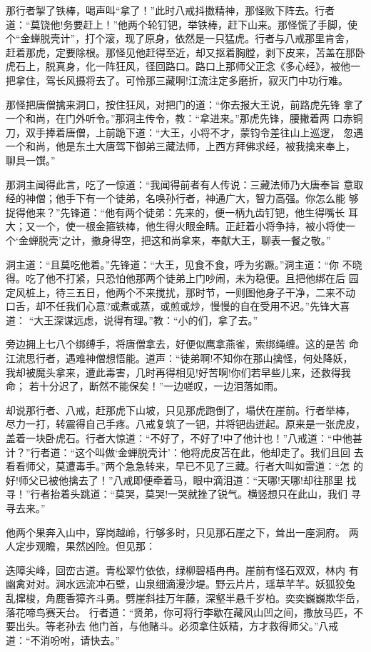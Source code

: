 那行者掣了铁棒，喝声叫“拿了！”此时八戒抖擞精神，那怪败下阵去。行者
道：“莫饶他!务要赶上！”他两个轮钉钯，举铁棒，赶下山来。那怪慌了手脚，使
个“金蝉脱壳计”，打个滚，现了原身，依然是一只猛虎。行者与八戒那里肯舍，
赶着那虎，定要除根。那怪见他赶得至近，却又抠着胸膛，剥下皮来，苫盖在那卧
虎石上，脱真身，化一阵狂风，径回路口。路口上那师父正念《多心经》，被他一
把拿住，驾长风摄将去了。可怜那三藏啊!江流注定多磨折，寂灭门中功行难。

那怪把唐僧擒来洞口，按住狂风，对把门的道：“你去报大王说，前路虎先锋
拿了一个和尚，在门外听令。”那洞主传令，教：“拿进来。”那虎先锋，腰撇着两
口赤铜刀，双手捧着唐僧，上前跪下道：“大王，小将不才，蒙钧令差往山上巡逻，
忽遇一个和尚，他是东土大唐驾下御弟三藏法师，上西方拜佛求经，被我擒来奉上，
聊具一馔。”

那洞主闻得此言，吃了一惊道：“我闻得前者有人传说：三藏法师乃大唐奉旨
意取经的神僧；他手下有一个徒弟，名唤孙行者，神通广大，智力高强。你怎么能
够捉得他来？”先锋道：“他有两个徒弟：先来的，便一柄九齿钉钯，他生得嘴长
耳大；又一个，使一根金箍铁棒，他生得火眼金睛。正赶着小将争持，被小将使一
个‘金蝉脱壳’之计，撤身得空，把这和尚拿来，奉献大王，聊表一餐之敬。”

洞主道：“且莫吃他着。”先锋道：“大王，见食不食，呼为劣蹶。”洞主道：“你
不晓得。吃了他不打紧，只恐怕他那两个徒弟上门吵闹，未为稳便。且把他绑在后
园定风桩上，待三五日，他两个不来搅扰，那时节，一则图他身子干净，二来不动
口舌，却不任我们心意?或煮或蒸，或煎或炒，慢慢的自在受用不迟。”先锋大喜道：
“大王深谋远虑，说得有理。”教：“小的们，拿了去。”

旁边拥上七八个绑缚手，将唐僧拿去，好便似鹰拿燕雀，索绑绳缠。这的是苦
命江流思行者，遇难神僧想悟能。道声：“徒弟啊!不知你在那山擒怪，何处降妖，
我却被魔头拿来，遭此毒害，几时再得相见!好苦啊!你们若早些儿来，还救得我命；
若十分迟了，断然不能保矣！”一边嗟叹，一边泪落如雨。

却说那行者、八戒，赶那虎下山坡，只见那虎跑倒了，塌伏在崖前。行者举棒，
尽力一打，转震得自己手疼。八戒复筑了一钯，并将钯齿迸起。原来是一张虎皮，
盖着一块卧虎石。行者大惊道：“不好了，不好了!中了他计也！”八戒道：“中他甚
计？”行者道：“这个叫做‘金蝉脱壳计’：他将虎皮苫在此，他却走了。我们且回
去看看师父，莫遭毒手。”两个急急转来，早已不见了三藏。行者大叫如雷道：“怎
的好!师父已被他擒去了！”八戒即便牵着马，眼中滴泪道：“天哪!天哪!却往那里
找寻！”行者抬着头跳道：“莫哭，莫哭!一哭就挫了锐气。横竖想只在此山，我们
寻寻去来。”

他两个果奔入山中，穿岗越岭，行够多时，只见那石崖之下，耸出一座洞府。
两人定步观瞻，果然凶险。但见那：

迭障尖峰，回峦古道。青松翠竹依依，绿柳碧梧冉冉。崖前有怪石双双，林内
有幽禽对对。涧水远流冲石壁，山泉细滴漫沙堤。野云片片，瑶草芊芊。妖狐狡兔
乱撺梭，角鹿香獐齐斗勇。劈崖斜挂万年藤，深壑半悬千岁柏。奕奕巍巍欺华岳，
落花啼鸟赛天台。
行者道：“贤弟，你可将行李歇在藏风山凹之间，撒放马匹，不要出头。等老孙去
他门首，与他赌斗。必须拿住妖精，方才救得师父。”八戒道：“不消吩咐，请快去。”

